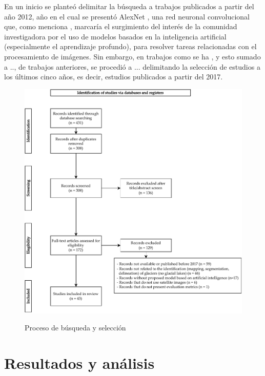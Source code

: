 \documentclass{article}
\begin{document}
En un inicio se planteó delimitar la búsqueda a trabajos publicados a partir del año 2012, año en el cual se presentó AlexNet \cite{krizhevsky2012imagenet}, una red neuronal convolucional que, como menciona \cite{hoeser2020object}, marcaría el surgimiento del interés de la comunidad investigadora por el uso de modelos basados en la inteligencia artificial (especialmente el aprendizaje profundo), para resolver tareas relacionadas con el procesamiento de imágenes. Sin embargo, en trabajos como \cite{ma2019deep} se ha , y esto sumado a .., de trabajos anteriores, se procedió a  ... delimitando la selección de estudios a los últimos cinco años, es decir, estudios publicados a partir del 2017.

\begin{figure}[H]
    \centering
    \includegraphics[width=1\textwidth]{images/prisma.pdf}
    \label{fig:prisma}
    \caption{Proceso de búsqueda y selección}
\end{figure}

\section{Resultados y análisis}
\end{document}
